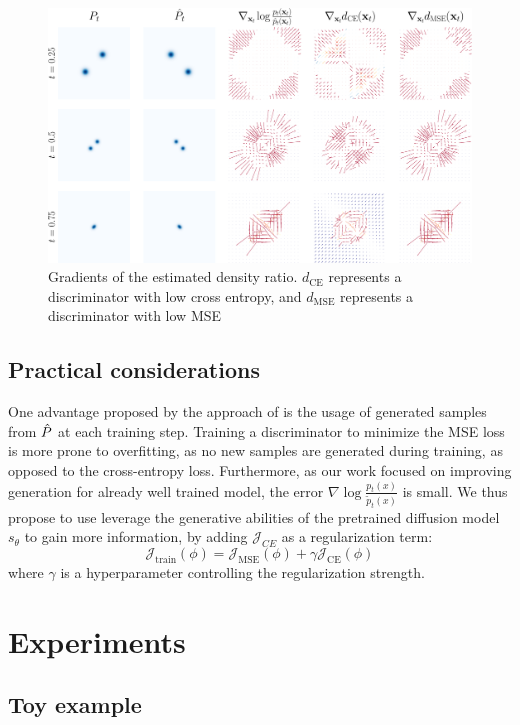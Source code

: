 \begin{figure}[t!]
    \centering
    \includegraphics[width=\linewidth]{gfx/quivers_wrt_ts.pdf}
    \caption{Gradients of the estimated density ratio. $d_{\mathrm{CE}}$ represents a discriminator with low cross entropy, and $d_{\mathrm{MSE}}$ represents a discriminator with low MSE}
    \label{fig:2D-quivers}
\end{figure}
\subsection{Practical considerations}
One advantage proposed by the approach of \citep{kim2023refininggenerativeprocessdiscriminator} is the usage of generated samples from $\Hat{P}$ at each training step. 
Training a discriminator to minimize the MSE loss is more prone to overfitting, as no new samples are generated during training, as opposed to the cross-entropy loss. Furthermore, as our work focused on improving generation for already well trained model, the error $\nabla \log \frac{p_{t}(x)}{\tilde{p}_{t}(x)}$ is small. We thus propose to use leverage the generative abilities of the pretrained diffusion model $s_{\theta}$ to gain more information, by adding $\mathcal{J}_{CE}$ as a regularization term: 
\begin{equation}
    \mathcal{J}_{\mathrm{train}}(\phi) = \mathcal{J}_{\mathrm{MSE}}(\phi) + \gamma\mathcal{J}_{\mathrm{CE}}(\phi)
\end{equation}
where $\gamma$ is a hyperparameter controlling the regularization strength.
\section{Experiments}
\subsection{Toy example}

